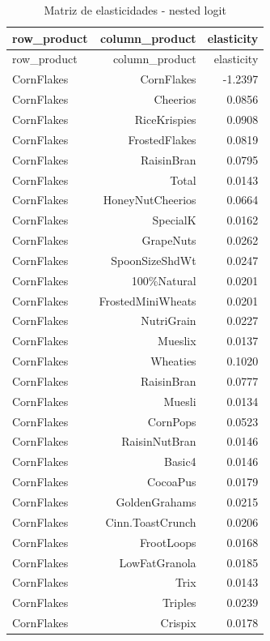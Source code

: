 \begingroup
\scriptsize
\begin{longtable}{@{}lrr@{}}
\caption{Matriz de elasticidades - nested logit}\label{tab:elas-nested}\\
\toprule
row\_product & column\_product & elasticity \\
\midrule
\endfirsthead
\toprule
row\_product & column\_product & elasticity \\
\midrule
\endhead
CornFlakes & CornFlakes & -1.2397 \\
CornFlakes & Cheerios & 0.0856 \\
CornFlakes & RiceKrispies & 0.0908 \\
CornFlakes & FrostedFlakes & 0.0819 \\
CornFlakes & RaisinBran & 0.0795 \\
CornFlakes & Total & 0.0143 \\
CornFlakes & HoneyNutCheerios & 0.0664 \\
CornFlakes & SpecialK & 0.0162 \\
CornFlakes & GrapeNuts & 0.0262 \\
CornFlakes & SpoonSizeShdWt & 0.0247 \\
CornFlakes & 100\%Natural & 0.0201 \\
CornFlakes & FrostedMiniWheats & 0.0201 \\
CornFlakes & NutriGrain & 0.0227 \\
CornFlakes & Mueslix & 0.0137 \\
CornFlakes & Wheaties & 0.1020 \\
CornFlakes & RaisinBran & 0.0777 \\
CornFlakes & Muesli & 0.0134 \\
CornFlakes & CornPops & 0.0523 \\
CornFlakes & RaisinNutBran & 0.0146 \\
CornFlakes & Basic4 & 0.0146 \\
CornFlakes & CocoaPus & 0.0179 \\
CornFlakes & GoldenGrahams & 0.0215 \\
CornFlakes & Cinn.ToastCrunch & 0.0206 \\
CornFlakes & FrootLoops & 0.0168 \\
CornFlakes & LowFatGranola & 0.0185 \\
CornFlakes & Trix & 0.0143 \\
CornFlakes & Triples & 0.0239 \\
CornFlakes & Crispix & 0.0178 \\

\end{longtable}
